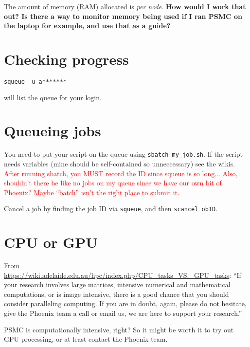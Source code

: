 \documentclass[a4]{article}
\begin{document}
The amount of memory (RAM) allocated is \emph{per node}. \textbf{How would I work that out? Is there a way to monitor memory being used if I ran PSMC on the laptop for example, and use that as a guide?}

\section{Checking progress}
\begin{lstlisting}
squeue -u a*******
\end{lstlisting}
will list the queue for your login.

\section{Queueing jobs}
You need to put your script on the queue using \texttt{sbatch my\_job.sh}. If the script needs variables (mine should be self-contained so unneccessary) see the wikis. \textcolor{red}{After running sbatch, you MUST record the ID since squeue is so long... Also, shouldn't there be like no jobs on my queue since we have our own bit of Phoenix? Maybe ``batch'' isn't the right place to submit it.}

Cancel a job by finding the job ID via \texttt{squeue}, and then \texttt{scancel obID}.


\section{CPU or GPU}
From \url{https://wiki.adelaide.edu.au/hpc/index.php/CPU_tasks_VS._GPU_tasks}: ``If your research involves large matrices, intensive numerical and mathematical computations, or is image intensive, there is a good chance that you should consider paralleling computing. If you are in doubt, again, please do not hesitate, give the Phoenix team a call or email us, we are here to support your research.''

PSMC is computationally intensive, right? So it might be worth it to try out GPU processing, or at least contact the Phoenix team.
\end{document}
